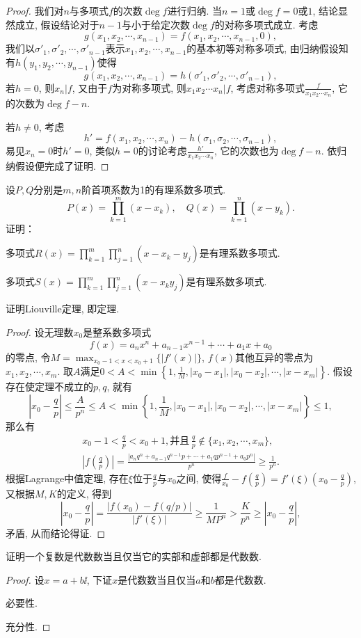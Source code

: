 \begin{quizb}
\begin{proof}
我们对\(n\)与多项式\(f\)的次数\(\deg f\)进行归纳. 当\(n=1\)或\(\deg f=0\)或\(1\), 结论显然成立, 假设结论对于\(n-1\)与小于给定次数\(\deg f\)的对称多项式成立. 考虑\[g(x_1,x_2,\cdots,x_{n-1})=f(x_1,x_2,\cdots,x_{n-1},0),\]我们以\(\sigma'_1,\sigma'_2,\cdots,\sigma'_{n-1}\)表示\(x_1,x_2,\cdots,x_{n-1}\)的基本初等对称多项式, 由归纳假设知有\(h(y_1,y_2,\cdots,y_{n-1})\)使得\[g(x_1,x_2,\cdots,x_{n-1})=h(\sigma'_1,\sigma'_2,\cdots,\sigma'_{n-1}),\]若\(h=0\), 则\(x_n\big| f\), 又由于\(f\)为对称多项式, 则\(x_1x_2\cdots x_n\big| f\), 考虑对称多项式\(\frac{f}{x_1x_2\cdots x_n}\), 它的次数为\(\deg f -n\). 

若\(h\ne 0\), 考虑\[h'=f(x_1,x_2,\cdots,x_{n})-h(\sigma_1,\sigma_2,\cdots,\sigma_{n-1}),\]
易见\(x_n=0\)时\(h'=0\), 类似\(h=0\)的讨论考虑\(\frac{h'}{x_1x_2\cdots x_n}\), 它的次数也为\(\deg f -n\). 依归纳假设便完成了证明.
\end{proof}
\woe 设\(P,Q\)分别是\(m,n\)阶首项系数为1的有理系数多项式.\[P(x)=\prod_{k=1}^{m}(x-x_k),\quad Q(x)=\prod_{k=1}^{n}(x-y_k).\]证明：
        \begin{quizs}
            \item 多项式\(R(x)=\prod_{k=1}^{m}\prod_{j=1}^{n}(x-x_k-y_j)\)是有理系数多项式.
            \item 多项式\(S(x)=\prod_{k=1}^{m}\prod_{j=1}^{n}(x-x_ky_j)\)是有理系数多项式.
        \end{quizs}
\woe 证明Liouville定理, 即定理.
\begin{proof}
设无理数\(x_0\)是整系数多项式\[f(x)=a_nx^n+a_{n-1}x^{n-1}+\cdots+a_1x+a_0\]的零点, 令\(M=\max_{x_0-1<x<x_0+1}\{|f'(x)|\}\), \(f(x)\)其他互异的零点为\(x_1,x_2,\cdots,x_m\). 取\(A\)满足\(0<A<\min\left\lbrace 1,\frac{1}{M},|x_0-x_1|,|x_0-x_2|,\cdots,|x-x_m| \right\rbrace\). 假设存在使定理不成立的\(p,q\), 就有\[\left|x_0-\frac{q}{p}\right|\leqslant\frac{A}{p^n}\leqslant A<\min\left\lbrace 1,\frac{1}{M},|x_0-x_1|,|x_0-x_2|,\cdots,|x-x_m| \right\rbrace\leqslant 1,\]那么有
\begin{gather*}
x_0-1<\frac{q}{p}<x_0+1,\text{并且}\,\frac{q}{p}\notin\{x_1,x_2,\cdots,x_m\},\\
\left|f\left(\frac{q}{p}\right)\right|=\frac{\left|a_nq^n+a_{n-1}q^{n-1}p+\cdots+a_1qp^{n-1}+a_0p^n\right|}{p^n}\geqslant\frac{1}{p^n}.
\end{gather*}根据Lagrange中值定理, 存在\(\xi\)位于\(\frac{q}{p}\)与\(x_0\)之间, 使得\(\frac{f}{x_0}-f\left(\frac{q}{p}\right)=f'(\xi)\left(x_0-\frac{q}{p}\right)\), 又根据\(M,K\)的定义, 得到\[\left|x_0-\frac{q}{p}\right|=\frac{|f(x_0)-f(q/p)|}{|f'(\xi)|}\geqslant\frac{1}{MP^n}>\frac{K}{p^n}\geqslant\left|x_0-\frac{q}{p}\right| ,\]矛盾, 从而结论得证.
\end{proof}
\woe 证明一个复数是代数数当且仅当它的实部和虚部都是代数数.
\begin{proof}
设\(x=a+b\ii\), 下证\(x\)是代数数当且仅当\(a\)和\(b\)都是代数数.

必要性.  

充分性.
\end{proof}
\end{quizb}
